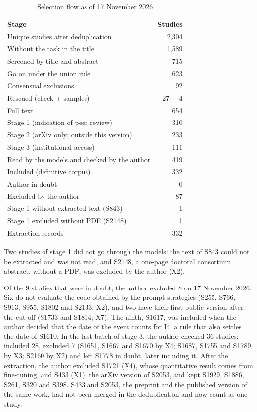 \begin{table}[!t]
\caption{Selection flow as of 17 November 2026}\label{tab:fluxo}
\centering\footnotesize
\begin{tabular}{@{}lr@{}}
\hline
Stage & Studies\\
\hline
Unique studies after deduplication & 2,304\\
\quad Without the task in the title & 1,589\\
Screened by title and abstract & 715\\
\quad Go on under the union rule & 623\\
\quad Consensual exclusions & 92\\
\quad\quad Rescued (check + samples) & 27 + 4\\
Full text & 654\\
\quad Stage 1 (indication of peer review) & 310\\
\quad Stage 2 (arXiv only; outside this version) & 233\\
\quad Stage 3 (institutional access) & 111\\
Read by the models and checked by the author & 419\\
\quad Included (definitive corpus) & 332\\
\quad Author in doubt & 0\\
\quad Excluded by the author & 87\\
Stage 1 without extracted text (S843) & 1\\
Stage 1 excluded without PDF (S2148) & 1\\
\hline
Extraction records & 332\\
\hline
\end{tabular}
\end{table}

Two studies of stage 1 did not go through the models: the text of S843 could not be extracted
and was not read, and S2148, a one-page doctoral consortium abstract, without a PDF, was excluded by the author
(X2).

Of the 9 studies that were in doubt, the author excluded 8 on 17 November 2026. Six do not evaluate the code obtained by the
prompt strategies (S255, S766, S913, S955, S1802 and S2133; X2), and two have their first public version after
the cut-off (S1733 and S1814; X7). The ninth, S1617, was included when the author decided that the date of the
event counts for I4, a rule that also settles the date of S1610. In the last batch of stage 3, the author checked 36
studies: included 28, excluded 7 (S1651, S1667 and S1670 by X4; S1687, S1755 and S1789 by X3; S2160 by X2) and
left S1778 in doubt, later including it. After the extraction, the author excluded S1721 (X4), whose quantitative
result comes from fine-tuning, and S433 (X1), the arXiv version of S2053, and kept S1929, S1886, S261, S320 and S398.
S433 and S2053, the preprint and the published version of the same work, had not been merged in the deduplication and now
count as one study.

